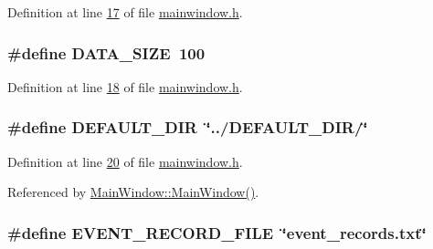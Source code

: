 Definition at line \hyperlink{a00039_source_l00017}{17} of file \hyperlink{a00039_source}{mainwindow.\+h}.

\hypertarget{a00039_af55149bc1f05cf18af067a302e31e3f9}{
\subsubsection[{D\+A\+T\+A\+\_\+\+S\+I\+Z\+E}]{\setlength{\rightskip}{0pt plus 5cm}\#define D\+A\+T\+A\+\_\+\+S\+I\+Z\+E~100}}\label{a00039_af55149bc1f05cf18af067a302e31e3f9}


Definition at line \hyperlink{a00039_source_l00018}{18} of file \hyperlink{a00039_source}{mainwindow.\+h}.

\hypertarget{a00039_a63ec0cea9c1f0ca8a7893c2c53d2fd81}{
\subsubsection[{D\+E\+F\+A\+U\+L\+T\+\_\+\+D\+I\+R}]{\setlength{\rightskip}{0pt plus 5cm}\#define D\+E\+F\+A\+U\+L\+T\+\_\+\+D\+I\+R~\char`\"{}../D\+E\+F\+A\+U\+L\+T\+\_\+\+D\+I\+R/\char`\"{}}}\label{a00039_a63ec0cea9c1f0ca8a7893c2c53d2fd81}


Definition at line \hyperlink{a00039_source_l00020}{20} of file \hyperlink{a00039_source}{mainwindow.\+h}.



Referenced by \hyperlink{a00038_source_l00024}{Main\+Window\+::\+Main\+Window()}.

\hypertarget{a00039_a8d4ad2cd60e024f6e0f37dbac40768a1}{
\subsubsection[{E\+V\+E\+N\+T\+\_\+\+R\+E\+C\+O\+R\+D\+\_\+\+F\+I\+L\+E}]{\setlength{\rightskip}{0pt plus 5cm}\#define E\+V\+E\+N\+T\+\_\+\+R\+E\+C\+O\+R\+D\+\_\+\+F\+I\+L\+E~\char`\"{}event\+\_\+records.\+txt\char`\"{}}}\label{a00039_a8d4ad2cd60e024f6e0f37dbac40768a1}


